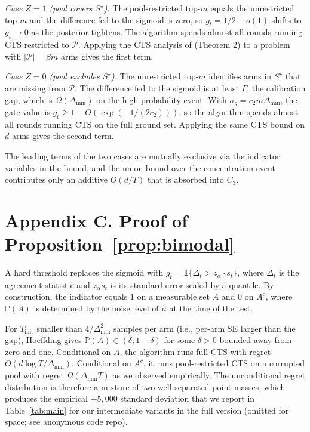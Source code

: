 \documentclass{article}
\theoremstyle{plain}
\theoremstyle{definition}
\theoremstyle{remark}
\newcommand{\Prob}{\mathbb{P}}
\newcommand{\Pool}{\mathcal{P}}
\newcommand{\opt}{S^{\star}}
\newcommand{\gap}{\Delta_{\min}}
\begin{document}
\emph{Case $Z = 1$ (pool covers $\opt$).} The pool-restricted top-$m$ equals the unrestricted top-$m$ and the difference fed to the sigmoid is zero, so $g_t = 1/2 + o(1)$ shifts to $g_t \to 0$ as the posterior tightens. The algorithm spends almost all rounds running CTS restricted to $\Pool$. Applying the CTS analysis of \citet{wang2018cts} (Theorem 2) to a problem with $|\Pool| = \beta m$ arms gives the first term.

\emph{Case $Z = 0$ (pool excludes $\opt$).} The unrestricted top-$m$ identifies arms in $\opt$ that are missing from $\Pool$. The difference fed to the sigmoid is at least $\Gamma$, the calibration gap, which is $\Omega(\gap)$ on the high-probability event. With $\sigma_g = c_2 m \gap$, the gate value is $g_t \geq 1 - O(\exp(-1/(2 c_2)))$, so the algorithm spends almost all rounds running CTS on the full ground set. Applying the same CTS bound on $d$ arms gives the second term.

The leading terms of the two cases are mutually exclusive via the indicator variables in the bound, and the union bound over the concentration event contributes only an additive $O(d / T)$ that is absorbed into $C_3$.

\section*{Appendix C. Proof of Proposition~\ref{prop:bimodal}}
\label{app:bimodal}

A hard threshold replaces the sigmoid with $g_t = \mathbf{1}\{\Delta_t > z_\alpha \cdot s_t\}$, where $\Delta_t$ is the agreement statistic and $z_\alpha s_t$ is its standard error scaled by a quantile. By construction, the indicator equals $1$ on a measurable set $A$ and $0$ on $A^c$, where $\Prob(A)$ is determined by the noise level of $\hat{\mu}$ at the time of the test.

For $T_{\mathrm{init}}$ smaller than $4 / \gap^2$ samples per arm (i.e., per-arm SE larger than the gap), Hoeffding gives $\Prob(A) \in (\delta, 1 - \delta)$ for some $\delta > 0$ bounded away from zero and one. Conditional on $A$, the algorithm runs full CTS with regret $O(d \log T / \gap)$. Conditional on $A^c$, it runs pool-restricted CTS on a corrupted pool with regret $\Omega(\gap T)$ as we observed empirically. The unconditional regret distribution is therefore a mixture of two well-separated point masses, which produces the empirical $\pm 5{,}000$ standard deviation that we report in Table~\ref{tab:main} for our intermediate variants in the full version (omitted for space; see anonymous code repo).
\end{document}
